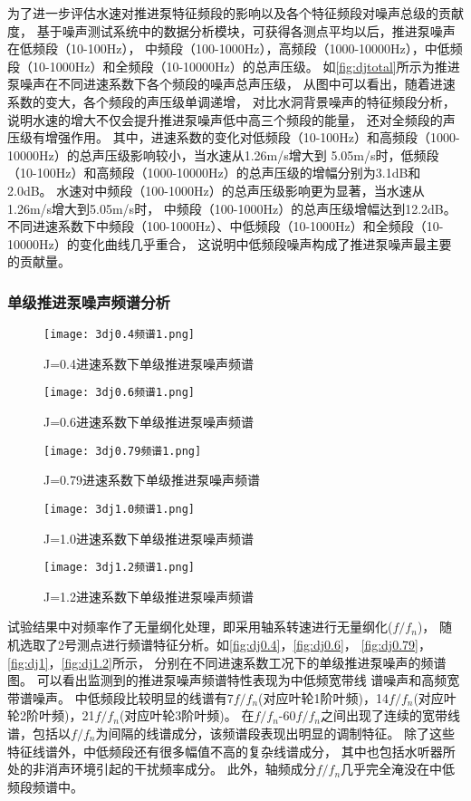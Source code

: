 为了进一步评估水速对推进泵特征频段的影响以及各个特征频段对噪声总级的贡献度，
基于噪声测试系统中的数据分析模块，可获得各测点平均以后，推进泵噪声在低频段（10-100Hz），
中频段（100-1000Hz），高频段（1000-10000Hz），中低频段（10-1000Hz）和全频段（10-10000Hz）的总声压级。
如\autoref{fig:djtotal}所示为推进泵噪声在不同进速系数下各个频段的噪声总声压级，
从图中可以看出，随着进速系数的变大，各个频段的声压级单调递增，
对比水洞背景噪声的特征频段分析，
说明水速的增大不仅会提升推进泵噪声低中高三个频段的能量，
还对全频段的声压级有增强作用。
其中，进速系数的变化对低频段（10-100Hz）和高频段（1000-10000Hz）的总声压级影响较小，当水速从1.26m/s增大到
5.05m/s时，低频段（10-100Hz）和高频段（1000-10000Hz）的总声压级的增幅分别为3.1dB和2.0dB。
水速对中频段（100-1000Hz）的总声压级影响更为显著，当水速从1.26m/s增大到5.05m/s时，
中频段（100-1000Hz）的总声压级增幅达到12.2dB。
不同进速系数下中频段（100-1000Hz）、中低频段（10-1000Hz）和全频段（10-10000Hz）的变化曲线几乎重合，
这说明中低频段噪声构成了推进泵噪声最主要的贡献量。
\subsubsection{单级推进泵噪声频谱分析}
\begin{figure}[htbp]
    \centering
    \texttt{[image: 3dj0.4频谱1.png]}
    \caption{\label{fig:dj0.4}J=0.4进速系数下单级推进泵噪声频谱}
\end{figure}
\begin{figure}[htbp]
    \centering
    \texttt{[image: 3dj0.6频谱1.png]}
    \caption{\label{fig:dj0.6}J=0.6进速系数下单级推进泵噪声频谱}
\end{figure}
\begin{figure}[htbp]
    \centering
    \texttt{[image: 3dj0.79频谱1.png]}
    \caption{\label{fig:dj0.79}J=0.79进速系数下单级推进泵噪声频谱}
\end{figure}
\begin{figure}[htbp]
    \centering
    \texttt{[image: 3dj1.0频谱1.png]}
    \caption{\label{fig:dj1}J=1.0进速系数下单级推进泵噪声频谱}
\end{figure}
\begin{figure}[htbp]
    \centering
    \texttt{[image: 3dj1.2频谱1.png]}
    \caption{\label{fig:dj1.2}J=1.2进速系数下单级推进泵噪声频谱}
\end{figure}

试验结果中对频率作了无量纲化处理，即采用轴系转速进行无量纲化($f/f_n$)，
随机选取了2号测点进行频谱特征分析。如\autoref{fig:dj0.4}，\autoref{fig:dj0.6}，
\autoref{fig:dj0.79}，\autoref{fig:dj1}，\autoref{fig:dj1.2}所示，
分别在不同进速系数工况下的单级推进泵噪声的频谱图。
可以看出监测到的推进泵噪声频谱特性表现为中低频宽带线
谱噪声和高频宽带谱噪声。
中低频段比较明显的线谱有7$f/f_n$(对应叶轮1阶叶频)，14$f/f_n$(对应叶轮2阶叶频)，21$f/f_n$(对应叶轮3阶叶频)。
在$f/f_n$-60$f/f_n$之间出现了连续的宽带线谱，包括以$f/f_n$为间隔的线谱成分，该频谱段表现出明显的调制特征。
除了这些特征线谱外，中低频段还有很多幅值不高的复杂线谱成分，
其中也包括水听器所处的非消声环境引起的干扰频率成分。
此外，轴频成分$f/f_n$几乎完全淹没在中低频段频谱中。

